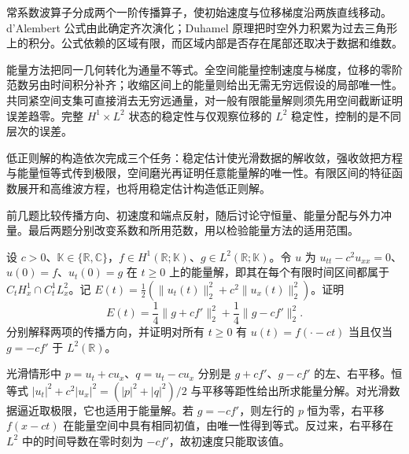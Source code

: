 



\begin{chaptersummary}
常系数波算子分成两个一阶传播算子，使初始速度与位移梯度沿两族直线移动。d'Alembert 公式由此确定齐次演化；Duhamel 原理把时空外力积累为过去三角形上的积分。公式依赖的区域有限，而区域内部是否存在尾部还取决于数据和维数。

\ProseParagraphBreak

能量方法把同一几何转化为通量不等式。全空间能量控制速度与梯度，位移的零阶范数另由时间积分补齐；收缩区间上的能量则给出无需无穷远假设的局部唯一性。共同紧空间支集可直接消去无穷远通量，对一般有限能量解则须先用空间截断证明误差趋零。完整 \(H^1\times L^2\) 状态的稳定性与仅观察位移的 \(L^2\) 稳定性，控制的是不同层次的误差。

\ProseParagraphBreak

低正则解的构造依次完成三个任务：稳定估计使光滑数据的解收敛，强收敛把方程与能量恒等式传到极限，空间磨光再证明任意能量解的唯一性。有限区间的特征函数展开和高维波方程，也将用稳定估计构造低正则解。
\end{chaptersummary}

\BookExercises

前几题比较传播方向、初速度和端点反射，随后讨论守恒量、能量分配与外力冲量。最后两题分别改变系数和所用范数，用以检验能量方法的适用范围。

\begin{exercise}\label{b2:ex:09-directional-energy}
设 \(c>0\)、\(\mathbb K\in\{\mathbb R,\mathbb C\}\)，\(f\in H^1(\mathbb R;\mathbb K)\)、\(g\in L^2(\mathbb R;\mathbb K)\)。令 \(u\) 为 \(u_{tt}-c^2u_{xx}=0\)、\(u(0)=f\)、\(u_t(0)=g\) 在 \(t\geq0\) 上的能量解，即其在每个有限时间区间都属于 \(C_tH^1_x\cap C_t^1L^2_x\)。记 \(E(t)=\frac12(\|u_t(t)\|_2^2+c^2\|u_x(t)\|_2^2)\)。证明
\[
 E(t)=\dfrac14\|g+cf'\|_2^2+\dfrac14\|g-cf'\|_2^2.
\]
分别解释两项的传播方向，并证明对所有 \(t\geq0\) 有 \(u(t)=f(\cdot-ct)\) 当且仅当 \(g=-cf'\) 于 \(L^2(\mathbb R)\)。
\end{exercise}
\begin{solution}
光滑情形中 \(p=u_t+cu_x\)、\(q=u_t-cu_x\) 分别是 \(g+cf'\)、\(g-cf'\) 的左、右平移。恒等式 \(|u_t|^2+c^2|u_x|^2=(|p|^2+|q|^2)/2\) 与平移等距性给出所求能量分解。对光滑数据逼近取极限，它也适用于能量解。若 \(g=-cf'\)，则左行的 \(p\) 恒为零，右平移 \(f(x-ct)\) 在能量空间中具有相同初值，由唯一性得到等式。反过来，右平移在 \(L^2\) 中的时间导数在零时刻为 \(-cf'\)，故初速度只能取该值。
\end{solution}

